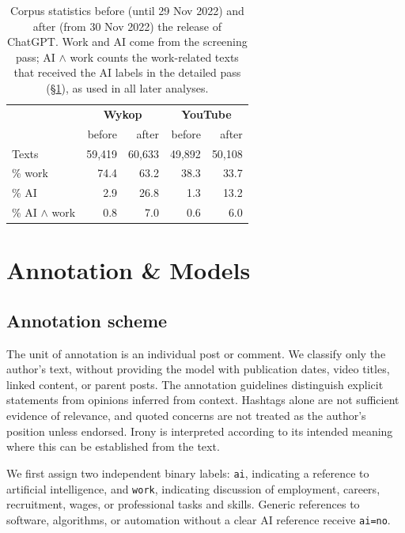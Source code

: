 \documentclass[11pt]{article}
\begin{document}
\begin{table}[t]
\centering
\small
\begin{tabular}{lrrrr}
\toprule
 & \multicolumn{2}{c}{\textbf{Wykop}} & \multicolumn{2}{c}{\textbf{YouTube}} \\
 & before & after & before & after \\
\midrule
Texts            & 59,419 & 60,633 & 49,892 & 50,108 \\
\% work          & 74.4   & 63.2   & 38.3 & 33.7 \\
\% AI            & 2.9    & 26.8   & 1.3 & 13.2 \\
\% AI $\wedge$ work & 0.8 & 7.0    & 0.6 & 6.0 \\
\bottomrule
\end{tabular}
\caption{Corpus statistics before (until 29 Nov 2022) and after (from 30 Nov 2022) the release of ChatGPT. Work and AI come from the screening pass; AI $\wedge$ work counts the work-related texts that received the AI labels in the detailed pass (\S\ref{sec:annotation}), as used in all later analyses.}
\label{tab:corpus}
\end{table}


\section{Annotation \& Models}
\label{sec:annotation}

\subsection{Annotation scheme}

The unit of annotation is an individual post or comment.
We classify only the author's text, without providing the model
with publication dates, video titles, linked content, or parent
posts. The annotation guidelines distinguish explicit statements
from opinions inferred from context. Hashtags alone are not
sufficient evidence of relevance, and quoted concerns are not
treated as the author's position unless endorsed. Irony is
interpreted according to its intended meaning where this can
be established from the text.

We first assign two independent binary labels:
\texttt{ai}, indicating a reference to artificial intelligence,
and \texttt{work}, indicating discussion of employment, careers,
recruitment, wages, or professional tasks and skills.
Generic references to software, algorithms, or automation
without a clear AI reference receive \texttt{ai=no}.
\end{document}
